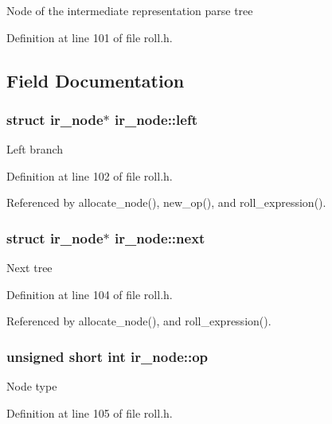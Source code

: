 Node of the intermediate representation parse tree 

Definition at line 101 of file roll.\+h.



\subsection{Field Documentation}
\hypertarget{structir__node_ab6ecf53bf92c825b620435fc93a6b6ee}{}
\subsubsection[{left}]{\setlength{\rightskip}{0pt plus 5cm}struct {\bf ir\+\_\+node}$\ast$ ir\+\_\+node\+::left}\label{structir__node_ab6ecf53bf92c825b620435fc93a6b6ee}
Left branch 

Definition at line 102 of file roll.\+h.



Referenced by allocate\+\_\+node(), new\+\_\+op(), and roll\+\_\+expression().

\hypertarget{structir__node_ab1d37e8ddfafb50b2633b66af37fb064}{}
\subsubsection[{next}]{\setlength{\rightskip}{0pt plus 5cm}struct {\bf ir\+\_\+node}$\ast$ ir\+\_\+node\+::next}\label{structir__node_ab1d37e8ddfafb50b2633b66af37fb064}
Next tree 

Definition at line 104 of file roll.\+h.



Referenced by allocate\+\_\+node(), and roll\+\_\+expression().

\hypertarget{structir__node_a4d977601c157f732bd7655d7a47e8545}{}
\subsubsection[{op}]{\setlength{\rightskip}{0pt plus 5cm}unsigned short int ir\+\_\+node\+::op}\label{structir__node_a4d977601c157f732bd7655d7a47e8545}
Node type 

Definition at line 105 of file roll.\+h.



